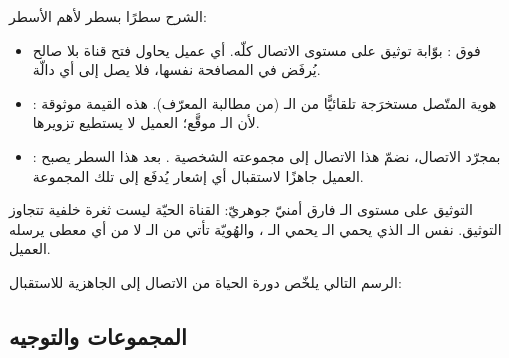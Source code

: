 الشرح سطرًا بسطر لأهم الأسطر:
\begin{itemize}
\item \code{[Authorize]} فوق : بوّابة توثيق على مستوى
  الاتصال كلّه. أي عميل يحاول فتح قناة بلا  صالح يُرفَض في المصافحة نفسها،
  فلا يصل إلى أي دالّة.
\item {}: هوية المتّصل مستخرَجة تلقائيًّا من الـ
   (من مطالبة المعرّف). هذه القيمة موثوقة لأن الـ  موقَّع؛
  العميل لا يستطيع تزويرها.
\item {}: بمجرّد
  الاتصال، نضمّ هذا الاتصال إلى مجموعته الشخصية . بعد هذا السطر
  يصبح العميل جاهزًا لاستقبال أي إشعار يُدفَع إلى تلك المجموعة.
\end{itemize}

\begin{secnote}
التوثيق على مستوى الـ  فارق أمنيّ جوهريّ: القناة الحيّة ليست ثغرة خلفية
تتجاوز التوثيق. نفس الـ  الذي يحمي الـ  يحمي الـ
، والهُويّة تأتي من الـ  لا من أي معطى يرسله العميل.
\end{secnote}

الرسم التالي يلخّص دورة الحياة من الاتصال إلى الجاهزية للاستقبال:

\begin{center}\begin{LTR}
\end{LTR}\end{center}

\subsection{المجموعات والتوجيه }

